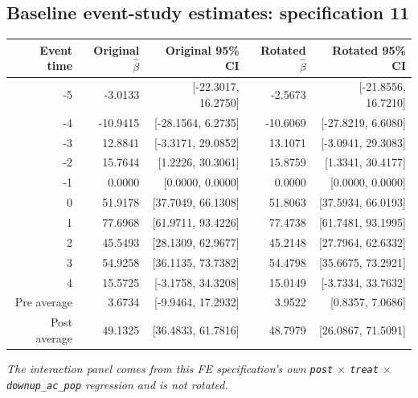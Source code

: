 \documentclass[10pt]{article}
\begin{document}
\subsection*{Baseline event-study estimates: specification 11}
\begin{center}
\scriptsize
\begin{tabular}{r rr rr}
\toprule
Event time & Original $\hat\beta$ & Original 95\% CI & Rotated $\hat\beta$ & Rotated 95\% CI \\
\midrule
-5 & -3.0133 & [-22.3017, 16.2750] & -2.5673 & [-21.8556, 16.7210] \\
-4 & -10.9415 & [-28.1564, 6.2735] & -10.6069 & [-27.8219, 6.6080] \\
-3 & 12.8841 & [-3.3171, 29.0852] & 13.1071 & [-3.0941, 29.3083] \\
-2 & 15.7644 & [1.2226, 30.3061] & 15.8759 & [1.3341, 30.4177] \\
-1 & 0.0000 & [0.0000, 0.0000] & 0.0000 & [0.0000, 0.0000] \\
0 & 51.9178 & [37.7049, 66.1308] & 51.8063 & [37.5934, 66.0193] \\
1 & 77.6968 & [61.9711, 93.4226] & 77.4738 & [61.7481, 93.1995] \\
2 & 45.5493 & [28.1309, 62.9677] & 45.2148 & [27.7964, 62.6332] \\
3 & 54.9258 & [36.1135, 73.7382] & 54.4798 & [35.6675, 73.2921] \\
4 & 15.5725 & [-3.1758, 34.3208] & 15.0149 & [-3.7334, 33.7632] \\
\midrule
Pre average & 3.6734 & [-9.9464, 17.2932] & 3.9522 & [0.8357, 7.0686] \\
Post average & 49.1325 & [36.4833, 61.7816] & 48.7979 & [26.0867, 71.5091] \\
\bottomrule
\end{tabular}
\end{center}
\medskip
\textit{The interaction panel comes from this FE specification's own \texttt{post} $\times$ \texttt{treat} $\times$ \texttt{downup\_ac\_pop} regression and is not rotated.}
\clearpage
\end{document}
